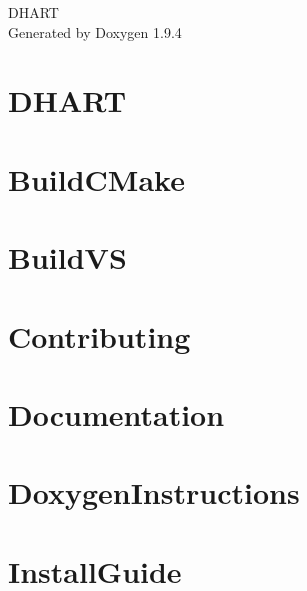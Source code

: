 \documentclass[twoside]{book}
\newcommand{\+}{\discretionary{\mbox{\scriptsize$\hookleftarrow$}}{}{}}
\newcommand{\clearemptydoublepage}{%
    \newpage{\pagestyle{empty}\cleardoublepage}%
  }
\begin{document}
  \raggedbottom
    \hypersetup{pageanchor=false,
                bookmarksnumbered=true,
                pdfencoding=unicode
               }
  \begin{titlepage}
  \vspace*{7cm}
  \begin{center}%
  {\Large DHART}\\
  \vspace*{1cm}
  {\large Generated by Doxygen 1.9.4}\\
  \end{center}
  \end{titlepage}
  \clearemptydoublepage
  \tableofcontents
  \clearemptydoublepage
  \hypersetup{pageanchor=true}
\chapter{DHART}
\label{index}\hypertarget{index}{}
\chapter{Build\+CMake}
\label{a03459}

\chapter{Build\+VS}
\label{a03460}

\chapter{Contributing}
\label{a03461}

\chapter{Documentation}
\label{a03462}

\chapter{Doxygen\+Instructions}
\label{a03463}

\chapter{Install\+Guide}
\label{a03464}

\end{document}
